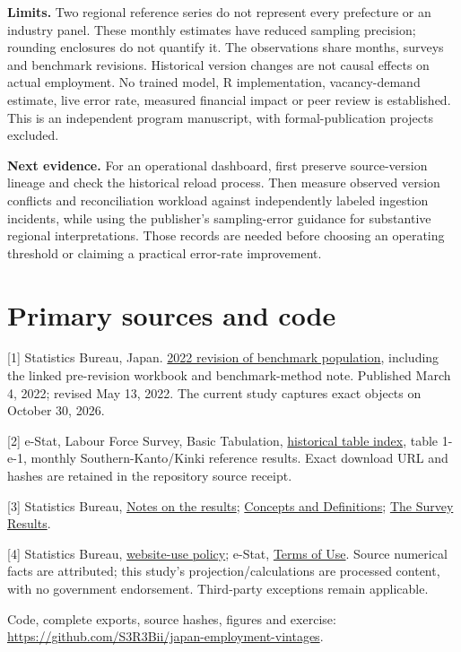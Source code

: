 \documentclass[10pt,letterpaper]{article}
\begin{document}
\textbf{Limits.} Two regional reference series do not represent every prefecture or an industry panel. These monthly estimates have reduced sampling precision; rounding enclosures do not quantify it. The observations share months, surveys and benchmark revisions. Historical version changes are not causal effects on actual employment. No trained model, R implementation, vacancy-demand estimate, live error rate, measured financial impact or peer review is established. This is an independent program manuscript, with formal-publication projects excluded.

\textbf{Next evidence.} For an operational dashboard, first preserve source-version lineage and check the historical reload process. Then measure observed version conflicts and reconciliation workload against independently labeled ingestion incidents, while using the publisher's sampling-error guidance for substantive regional interpretations. Those records are needed before choosing an operating threshold or claiming a practical error-rate improvement.

\section*{Primary sources and code}
\small
[1] Statistics Bureau, Japan. \href{https://www.stat.go.jp/english/data/roudou/220201/index.html}{2022 revision of benchmark population}, including the linked pre-revision workbook and benchmark-method note. Published March 4, 2022; revised May 13, 2022. The current study captures exact objects on October 30, 2026.

[2] e-Stat, Labour Force Survey, Basic Tabulation, \href{https://www.e-stat.go.jp/en/stat-search/files?cycle=0\&tclass=000001226526}{historical table index}, table 1-e-1, monthly Southern-Kanto/Kinki reference results. Exact download URL and hashes are retained in the repository source receipt.

[3] Statistics Bureau, \href{https://www.stat.go.jp/english/data/roudou/note.html}{Notes on the results}; \href{https://www.stat.go.jp/english/data/roudou/pdf/definite.pdf}{Concepts and Definitions}; \href{https://www.stat.go.jp/english/data/roudou/result.html}{The Survey Results}.

[4] Statistics Bureau, \href{https://www.stat.go.jp/english/info/riyou.html}{website-use policy}; e-Stat, \href{https://www.e-stat.go.jp/en/terms-of-use}{Terms of Use}. Source numerical facts are attributed; this study's projection/calculations are processed content, with no government endorsement. Third-party exceptions remain applicable.

Code, complete exports, source hashes, figures and exercise: \url{https://github.com/S3R3Bii/japan-employment-vintages}.
\end{document}
